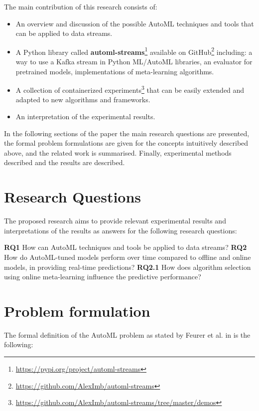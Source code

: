 \documentclass{sig-alternate-br}
\begin{document}
The main contribution of this research consists of:
\begin{itemize}
  \item An overview and discussion of the possible AutoML techniques and tools that can be applied to data streams.
  \item A Python library called \textbf{automl-streams}\footnote{\url{https://pypi.org/project/automl-streams}} available on GitHub\footnote{\url{https://github.com/AlexImb/automl-streams}} including: a way to use a Kafka stream in Python ML/AutoML libraries, an evaluator for pretrained models, implementations of meta-learning algorithms.
  \item A collection of containerized experiments\footnote{\url{https://github.com/AlexImb/automl-streams/tree/master/demos}} that can be easily extended and adapted to new algorithms and frameworks.
  \item An interpretation of the experimental results.
 
\end{itemize}

In the following sections of the paper the main research questions are presented, the formal problem formulations are given for the concepts intuitively described above, and the related work is summarised. Finally, experimental methods described and the results are described.

\section{Research Questions}
The proposed research aims to provide relevant experimental results and interpretations of the results as answers for the following research questions: 

\textbf{RQ1} How can AutoML techniques and tools be applied to data streams?
\newline
\newline
\textbf{RQ2} How do AutoML-tuned models perform over time compared to offline and online models, in providing real-time predictions?
		\newline\-\hspace{0.5cm}\textbf{RQ2.1} How does algorithm selection using online meta-learning influence the predictive performance?
    
\section{Problem formulation}
The formal definition of the AutoML problem as stated by Feurer et al. in \cite{feurer2015autosklearn} is the following:
\end{document}
